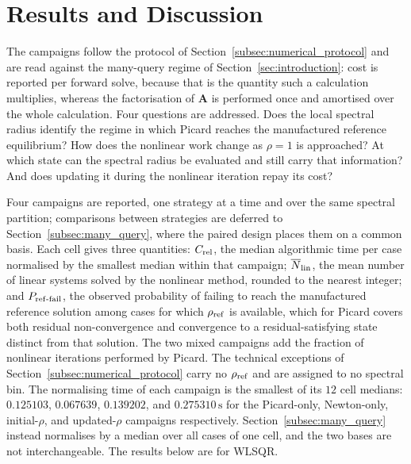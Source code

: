 \section{Results and Discussion}
\label{sec:results_discussion}

The campaigns follow the protocol of Section~\ref{subsec:numerical_protocol} and are read against the many-query regime of Section~\ref{sec:introduction}: cost is reported per forward solve, because that is the quantity such a calculation multiplies, whereas the factorisation of $\mathbf{A}$ is performed once and amortised over the whole calculation. Four questions are addressed. Does the local spectral radius identify the regime in which Picard reaches the manufactured reference equilibrium? How does the nonlinear work change as $\rho=1$ is approached? At which state can the spectral radius be evaluated and still carry that information? And does updating it during the nonlinear iteration repay its cost?

Four campaigns are reported, one strategy at a time and over the same spectral partition; comparisons between strategies are deferred to Section~\ref{subsec:many_query}, where the paired design places them on a common basis. Each cell gives three quantities: $C_{\rm rel}$, the median algorithmic time per case normalised by the smallest median within that campaign; $\overline{N}_{\rm lin}$, the mean number of linear systems solved by the nonlinear method, rounded to the nearest integer; and $P_{\rm ref\text{-}fail}$, the observed probability of failing to reach the manufactured reference solution among cases for which $\rho_{\rm ref}$ is available, which for Picard covers both residual non-convergence and convergence to a residual-satisfying state distinct from that solution. The two mixed campaigns add the fraction of nonlinear iterations performed by Picard. The technical exceptions of Section~\ref{subsec:numerical_protocol} carry no $\rho_{\rm ref}$ and are assigned to no spectral bin. The normalising time of each campaign is the smallest of its $12$ cell medians: $0.125103$, $0.067639$, $0.139202$, and $0.275310\,\mathrm{s}$ for the Picard-only, Newton-only, initial-$\rho$, and updated-$\rho$ campaigns respectively. Section~\ref{subsec:many_query} instead normalises by a median over all cases of one cell, and the two bases are not interchangeable. The results below are for WLSQR.

